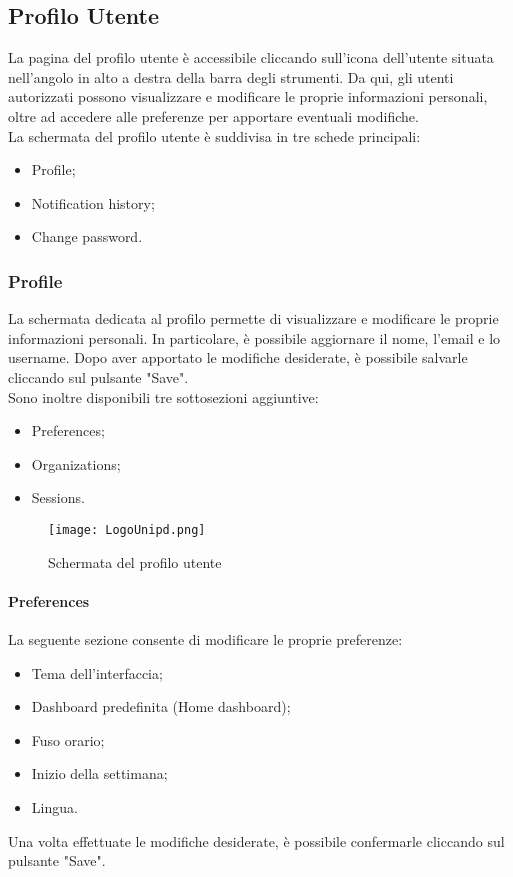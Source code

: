 \documentclass[10pt]{article}
\begin{document}
\begin{justify}
\subsection{Profilo Utente}
La pagina del profilo utente è accessibile cliccando sull'icona dell'utente situata nell'angolo in alto a destra della barra degli strumenti. Da qui, gli utenti autorizzati possono visualizzare e modificare le proprie informazioni personali, oltre ad accedere alle preferenze per apportare eventuali modifiche.\\
La schermata del profilo utente è suddivisa in tre schede principali:  
\begin{itemize}  
    \item Profile; 
    \item Notification history; 
    \item Change password.  
\end{itemize}
    
    \subsubsection{Profile}
    La schermata dedicata al profilo permette di visualizzare e modificare le proprie informazioni personali. In particolare, è possibile aggiornare il nome, l'email e lo username. Dopo aver apportato le modifiche desiderate, è possibile salvarle cliccando sul pulsante "Save".\\
    Sono inoltre disponibili tre sottosezioni aggiuntive:
    \begin{itemize}
        \item Preferences;
        \item Organizations;
        \item Sessions.
    \end{itemize}
    \begin{figure}[H]
    \centering
    \texttt{[image: LogoUnipd.png]}
    \caption{Schermata del profilo utente}
    \end{figure}

    \paragraph{Preferences}
    La seguente sezione consente di modificare le proprie preferenze:  
    \begin{itemize}  
        \item Tema dell'interfaccia;  
        \item Dashboard predefinita (Home dashboard);  
        \item Fuso orario;  
        \item Inizio della settimana;  
        \item Lingua.  
    \end{itemize}  
    Una volta effettuate le modifiche desiderate, è possibile confermarle cliccando sul pulsante "Save". 
    

\end{justify}
\end{document}
